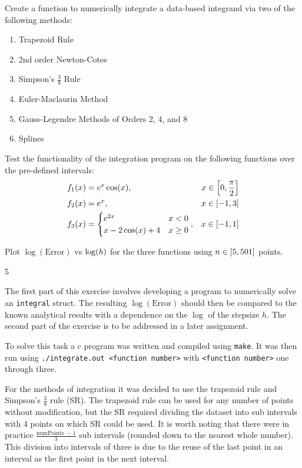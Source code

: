 \documentclass[12pt]{article}
\newenvironment{sol}[1][Solution]{\begin{trivlist}
\item[\hskip \labelsep {\bfseries #1:}]}{\end{trivlist}}
\DeclarePairedDelimiter\rb{(}{)}
\DeclarePairedDelimiter\sqrb{[}{]}
\begin{document}
Create a function to numerically integrate a data-based integrand via two of the following methods:
\begin{enumerate}[label=(\alph*)]
    \item Trapezoid Rule
    \item  2nd order Newton-Cotes
    \item Simpson's \(\frac{3}{8}\) Rule
    \item Euler-Maclaurin Method
    \item  Gauss-Legendre Methods of Orders 2, 4, and 8
    \item Splines
\end{enumerate}

Test the functionality of the integration program on the following functions over the pre-defined intervals:
\begin{align*}
    f_{1} \rb*{ x} & =  e^{x} \cos \rb*{x}, &x \in \sqrb*{0, \frac{\pi}{2}} &\\
    f_{2} \rb*{ x} & =  e^{x}, &x \in \sqrb*{-1, 3} &\\
    f_{3} \rb*{x}& =  
    \begin{cases}
            e^{2x}  & x < 0 \\
            x - 2 \cos \rb*{ x} + 4  & x \geq 0 
        \end{cases}, &x \in \sqrb*{-1,1}
\end{align*}

Plot \(\log(\text{Error} )\) vs \(\log \rb*{h}\) for the three functions using \(n \in \sqrb*{5, 501}\) points.

\begin{sol} 5 \end{sol}

The first part of this exercise involves developing a program to numerically solve an \texttt{integral} struct. The resulting \(\log(\text{Error} )\) should then be compared to the known analytical results with a dependence on the \(\log\) of the stepsize \(h\). The second part of the exercise is to be addressed in a later assignment. 

To solve this task a c program was written and compiled using \texttt{make}. It was then run using \texttt{./integrate.out <function number>} with \texttt{<function number>} one through three.

For the methods of integration it was decided to use the trapezoid rule and Simpson's \(\frac{3}{8}\) rule (SR). The trapezoid rule can be used for any number of points without modification, but the SR required dividing the dataset into sub intervals with 4 points on which SR could be used. It is worth noting that there were in practice \(\frac{\text{numPoints }  - 1}{3}\) sub intervals (rounded down to the nearest whole number). This division into intervals of three is due to the reuse of the last point in an interval as the first point in the next interval. 
\end{document}
